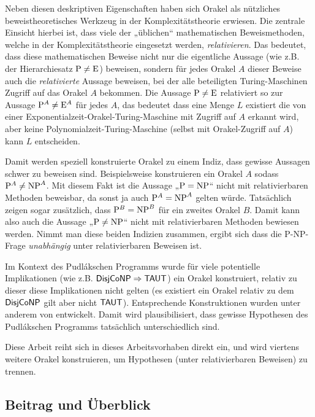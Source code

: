Neben diesen deskriptiven Eigenschaften haben sich Orakel als nützliches beweistheoretisches Werkzeug in der Komplexitätstheorie erwiesen. Die zentrale Einsicht hierbei ist, dass viele der „üblichen“ mathematischen Beweismethoden, welche in der Komplexitätstheorie eingesetzt werden, \emph{relativieren}. Das bedeutet, dass diese mathematischen Beweise nicht nur die eigentliche Aussage (wie z.B. der Hierarchiesatz $\P\neq \mathrm{E}$) beweisen, sondern für jedes Orakel $A$ dieser Beweise auch die \emph{relativierte} Aussage beweisen, bei der  alle beteiligten Turing-Maschinen Zugriff auf das Orakel $A$ bekommen. Die Aussage $\P\neq \mathrm{E}$ relativiert so zur Aussage $\P^A\neq \mathrm{E}^A$ für jedes $A$, das bedeutet dass eine Menge $L$ existiert die von einer Exponentialzeit-Orakel-Turing-Maschine mit Zugriff auf $A$ erkannt wird, aber keine Polynomialzeit-Turing-Maschine (selbst mit Orakel-Zugriff auf $A$) kann $L$ entscheiden.

Damit werden speziell konstruierte Orakel zu einem Indiz, dass gewisse Aussagen schwer zu beweisen sind.
Beispielsweise konstruieren \textcite{baker_relativizations_1975} ein Orakel $A$ sodass $\P^A\neq \NP^A$. Mit diesem Fakt ist die Aussage „$\P=\NP$“ nicht mit relativierbaren Methoden beweisbar, da sonst ja auch $\P^A=\NP^A$ gelten würde. Tatsächlich zeigen \citeauthor{baker_relativizations_1975} sogar zusätzlich, dass $\P^B= \NP^B$ für ein zweites Orakel $B$. Damit kann also auch die Aussage „$\P\neq\NP$“ nicht mit relativierbaren Methoden bewiesen werden. Nimmt man diese beiden Indizien zusammen, ergibt sich dass die P-NP-Frage \emph{unabhängig} unter relativierbaren Beweisen ist.

Im Kontext des Pudlákschen Programms wurde für viele potentielle Implikationen (wie z.B. $\hDisjCoNP\Rightarrow\hTAUT$) ein Orakel konstruiert, relativ zu dieser diese Implikationen nicht gelten (es existiert ein Orakel relativ zu dem $\hDisjCoNP$ gilt aber nicht $\hTAUT$). Entsprechende Konstruktionen wurden unter anderem von \textcites{glaser_disjoint_2004}{dose_np-completeness_2019}{dose_balance_2020}{dose_further_2020}{dingel_separation_2022}{ehrmanntraut_oracle_2022}{khaniki_new_2022} entwickelt. Damit wird plausibilisiert, dass gewisse Hypothesen des Pudlákschen Programms tatsächlich unterschiedlich sind.

Diese Arbeit reiht sich in dieses Arbeitsvorhaben direkt ein, und wird viertens weitere Orakel konstruieren, um Hypothesen (unter relativierbaren Beweisen) zu trennen.

\subsection*{Beitrag und Überblick}

